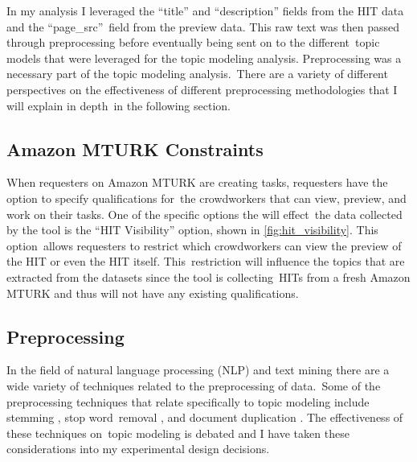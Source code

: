 \documentclass[letterpaper,12pt]{article}
\begin{document}
In my analysis I leveraged the ``title'' and ``description'' fields from the HIT data and the ``page\_src''\
field from the preview data. This raw text was then passed through preprocessing before eventually being sent on to the different\
topic models that were leveraged for the topic modeling analysis. Preprocessing was a necessary part of the topic modeling analysis.\
There are a variety of different perspectives on the effectiveness of different preprocessing methodologies that I will explain in depth\
in the following section.

\subsection{Amazon MTURK Constraints}
When requesters on Amazon MTURK are creating tasks, requesters have the option to specify qualifications for\
the crowdworkers that can view, preview, and work on their tasks. One of the specific options the will effect\
the data collected by the tool is the ``HIT Visibility'' option, shown in \ref{fig:hit_visibility}. This option\
allows requesters to restrict which crowdworkers can view the preview of the HIT or even the HIT itself. This\
restriction will influence the topics that are extracted from the datasets since the tool is collecting\
HITs from a fresh Amazon MTURK and thus will not have any existing qualifications.



\subsection{Preprocessing}
In the field of natural language processing (NLP) and text mining there are a wide variety of techniques related to the preprocessing of data.\
Some of the preprocessing techniques that relate specifically to topic modeling include stemming \cite{lovins1968development}, stop word\
removal \cite{silva2003importance}, and document duplication \cite{bouayad1999duplication}. The effectiveness of these techniques on\
topic modeling is debated and I have taken these considerations into my experimental design decisions.
\end{document}
